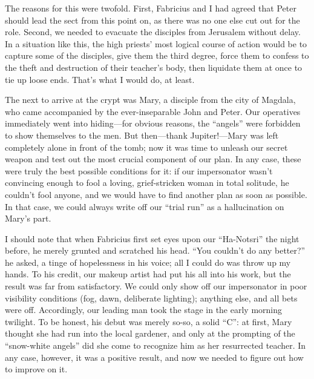 The reasons for this were twofold. First, Fabricius and I had agreed that Peter should lead the sect from this point on, as there was no one else cut out for the role. Second, we needed to evacuate the disciples from Jerusalem without delay. In a situation like this, the high priests' most logical course of action would be to capture some of the disciples, give them the third degree, force them to confess to the theft and destruction of their teacher's body, then liquidate them at once to tie up loose ends. That's what I would do, at least.

The next to arrive at the crypt was Mary, a disciple from the city of Magdala, who came accompanied by the ever-inseparable John and Peter. Our operatives immediately went into hiding---for obvious reasons, the ``angels'' were forbidden to show themselves to the men. But then---thank Jupiter!---Mary was left completely alone in front of the tomb; now it was time to unleash our secret weapon and test out the most crucial component of our plan. In any case, these were truly the best possible conditions for it: if our impersonator wasn't convincing enough to fool a loving, grief-stricken woman in total solitude, he couldn't fool anyone, and we would have to find another plan as soon as possible. In that case, we could always write off our ``trial run'' as a hallucination on Mary's part.

I should note that when Fabricius first set eyes upon our ``Ha-Notsri'' the night before, he merely grunted and scratched his head. ``You couldn't do any better?'' he asked, a tinge of hopelessness in his voice; all I could do was throw up my hands. To his credit, our makeup artist had put his all into his work, but the result was far from satisfactory. We could only show off our impersonator in poor visibility conditions (fog, dawn, deliberate lighting); anything else, and all bets were off. Accordingly, our leading man took the stage in the early morning twilight. To be honest, his debut was merely so-so, a solid ``C'': at first, Mary thought she had run into the local gardener, and only at the prompting of the ``snow-white angels'' did she come to recognize him as her resurrected teacher. In any case, however, it was a positive result, and now we needed to figure out how to improve on it.

